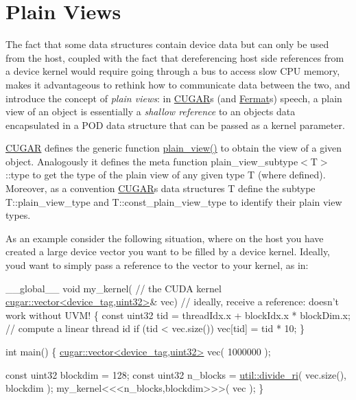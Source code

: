 \hypertarget{_fermat_host_device_page_FermatPlainViewsSection}{}\section{Plain Views}\label{_fermat_host_device_page_FermatPlainViewsSection}
\begin{DoxyParagraph}{}
The fact that some data structures contain device data but can only be used from the host, coupled with the fact that dereferencing host side references from a device kernel would require going through a bus to access slow C\+PU memory, makes it advantageous to rethink how to communicate data between the two, and introduce the concept of {\itshape plain views}\+: in \hyperlink{cugar_page}{C\+U\+G\+AR}\textquotesingle{}s (and \hyperlink{index}{Fermat}\textquotesingle{}s) speech, a plain view of an object is essentially a {\itshape shallow reference} to an object\textquotesingle{}s data encapsulated in a P\+OD data structure that can be passed as a kernel parameter. 
\end{DoxyParagraph}
\begin{DoxyParagraph}{}
\hyperlink{cugar_page}{C\+U\+G\+AR} defines the generic function \hyperlink{group___basic_ga6eb01f34e803fa6b384bf9930f6db426}{plain\+\_\+view()} to obtain the view of a given object. Analogously it defines the meta function plain\+\_\+view\+\_\+subtype$<$\+T$>$\+::type to get the type of the plain view of any given type T (where defined). Moreover, as a convention \hyperlink{cugar_page}{C\+U\+G\+AR}\textquotesingle{}s data structures T define the subtype T\+::plain\+\_\+view\+\_\+type and T\+::const\+\_\+plain\+\_\+view\+\_\+type to identify their plain view types. 
\end{DoxyParagraph}
\begin{DoxyParagraph}{}
As an example consider the following situation, where on the host you have created a large device vector you want to be filled by a device kernel. Ideally, you\textquotesingle{}d want to simply pass a reference to the vector to your kernel, as in\+: 
\begin{DoxyCode}
\_\_global\_\_ \textcolor{keywordtype}{void} my\_kernel(                   \textcolor{comment}{// the CUDA kernel}
    \hyperlink{structcugar_1_1vector}{cugar::vector<device\_tag,uint32>}& vec)   \textcolor{comment}{// ideally, receive a
       reference: doesn't work without UVM!}
\{
    \textcolor{keyword}{const} uint32 tid = threadIdx.x + blockIdx.x * blockDim.x; \textcolor{comment}{// compute a linear thread id}
    \textcolor{keywordflow}{if} (tid < vec.size())
        vec[tid] = tid * 10;
\}

\textcolor{keywordtype}{int} main()
\{
    \hyperlink{structcugar_1_1vector}{cugar::vector<device\_tag,uint32>} vec( 1000000 );

    \textcolor{keyword}{const} uint32 blockdim = 128;
    \textcolor{keyword}{const} uint32 n\_blocks = \hyperlink{group___basic_utils_gabb6714186dbbd864f0a9298944ba509b}{util::divide\_ri}( vec.size(), blockdim ); 
    my\_kernel<<<n\_blocks,blockdim>>>( vec );
\}
\end{DoxyCode}
 
\end{DoxyParagraph}
